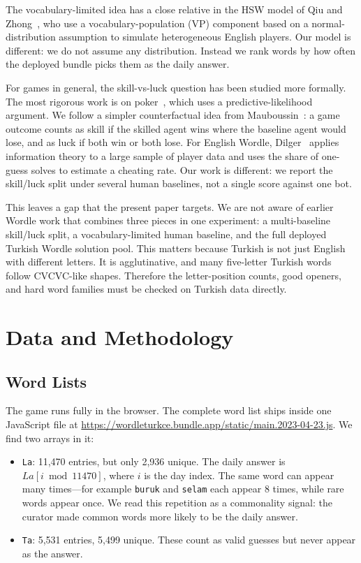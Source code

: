 \documentclass[conference]{IEEEtran}
\begin{document}
The vocabulary-limited idea has a close relative in the HSW model of
Qiu and Zhong~\cite{qiu2024hsw}, who use a vocabulary-population (VP)
component based on a normal-distribution assumption to simulate
heterogeneous English players. Our model is different: we do not assume
any distribution. Instead we rank words by how often the deployed
bundle picks them as the daily answer.

For games in general, the skill-vs-luck question has been studied more
formally. The most rigorous work is on poker~\cite{poker_luck}, which
uses a predictive-likelihood argument. We follow a simpler
counterfactual idea from Mauboussin~\cite{mauboussin2012success}: a
game outcome counts as skill if the skilled agent wins where the
baseline agent would lose, and as luck if both win or both lose. For
English Wordle, Dilger~\cite{dilger2023wordle} applies information
theory to a large sample of player data and uses the share of
one-guess solves to estimate a cheating rate. Our work is different:
we report the skill/luck split under several human baselines, not a
single score against one bot.

This leaves a gap that the present paper targets. We are not aware of
earlier Wordle work that combines three pieces in one experiment: a
multi-baseline skill/luck split, a vocabulary-limited human baseline,
and the full deployed Turkish Wordle solution pool. This matters because
Turkish is not just English with different letters. It is agglutinative,
and many five-letter Turkish words follow CVCVC-like shapes. Therefore
the letter-position counts, good openers, and hard word families must be
checked on Turkish data directly.

\section{Data and Methodology}
\label{sec:data}

\subsection{Word Lists}

The game runs fully in the browser. The complete word list ships inside
one JavaScript file at
\url{https://wordleturkce.bundle.app/static/main.2023-04-23.js}. We
find two arrays in it:

\begin{itemize}
\item \texttt{La}: 11{,}470 entries, but only 2{,}936 unique. The daily
answer is $La[i \bmod 11470]$, where $i$ is the day index. The same
word can appear many times---for example \texttt{buruk} and
\texttt{selam} each appear 8 times, while rare words appear once. We
read this repetition as a commonality signal: the curator made
common words more likely to be the daily answer.
\item \texttt{Ta}: 5{,}531 entries, 5{,}499 unique. These count as
valid guesses but never appear as the answer.
\end{itemize}
\end{document}
